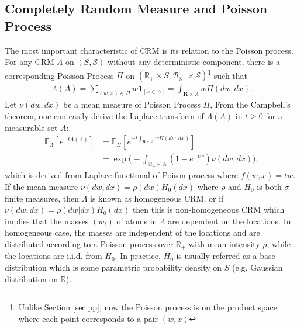 \documentclass{article}
\begin{document}
\subsection{Completely Random Measure and Poisson Process}
The most important characteristic of CRM is its relation to the Poisson process. For any CRM $\Lambda$ on $(S, \mathcal{S})$ without any deterministic component, there is a corresponding Poisson Process $\Pi$ on $(\mathbb{R}_+ \times S, \mathcal{B}_{\mathbb{R}_+} \times \mathcal{S})$\footnote{Unlike Section \ref{sec:pp}, now the Poisson process is on the product space where each point corresponds to a pair $(w, x)$} such that
\begin{align}
\Lambda(A) = \sum_{(w, x) \in \Pi}w \mathbf{1}_{[x \in A]} = \int_{\mathbf{R}\times A} w \Pi(dw, dx).
\end{align}
Let $\nu(dw, dx)$ be a mean measure of Poisson Process $\Pi$, From the Campbell's theorem, one can easily derive the Laplace transform of $\Lambda(A)$ in $t\ge 0$ for a measurable set $A$:
\begin{align}
\mathbb{E}_\Lambda[e^{-t\Lambda(A)}] &= \mathbb{E}_{\Pi}[e^{-t \int_{\mathbf{R}\times A} w \Pi(dw, dx) }] \\
& = \exp\Bigg( - \int_{\mathbb{R}_+ \times A} (1- e^{-tw}) \nu(dw,dx) \Bigg),
\end{align}
which is derived from Laplace functional of Poison process where $f(w, x) = tw$.
If the mean measure $\nu(dw, dx) = \rho(dw)H_0(dx)$ where $\rho$ and $H_0$ is both $\sigma$-finite measures, then $\Lambda$ is known as homogeneous CRM, or if $\nu(dw, dx) = \rho(dw|dx)H_0(dx)$ then this is non-homogeneous CRM which implies that the masses $(w_i)$ of atoms in $\Lambda$ are dependent on the locations. In homogeneous case, the masses are independent of the locations and are distributed according to a Poisson process over $\mathbb{R}_+$ with mean intensity $\rho$, while the locations are i.i.d. from $H_0$. In practice, $H_0$ is usually referred as a base distribution which is some parametric probability density on $S$ (e.g. Gaussian distribution on $\mathbb{R}$).
\end{document}
